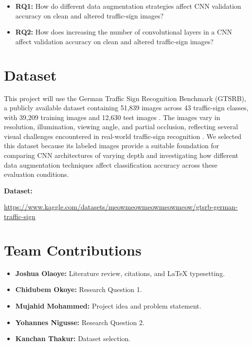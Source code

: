 \documentclass[11pt,letterpaper]{article}
\begin{document}
\begin{itemize}
  \item \textbf{RQ1:}	How do different data augmentation strategies affect CNN validation accuracy on clean and altered traffic-sign images?
  \item \textbf{RQ2:}	How does increasing the number of convolutional layers in a CNN affect validation accuracy on clean and altered traffic-sign images?
\end{itemize}

\section*{Dataset}
This project will use the German Traffic Sign Recognition Benchmark (GTSRB), a publicly available dataset containing 51,839 images across 43 traffic-sign classes, with 39,209 training images and 12,630 test images \cite{stallkamp2011gtsrb}. 
The images vary in resolution, illumination, viewing angle, and partial occlusion, reflecting several visual challenges encountered in real-world traffic-sign recognition \cite{stallkamp2011gtsrb}. 
We selected this dataset because its labeled images provide a suitable foundation for comparing CNN architectures of varying depth and investigating how different data augmentation techniques affect classification accuracy across these evaluation conditions.

\smallskip

\noindent\textbf{Dataset: }\par
\noindent\url{https://www.kaggle.com/datasets/meowmeowmeowmeowmeow/gtsrb-german-traffic-sign}




\section*{Team Contributions}

\begin{itemize}
  \item \textbf{Joshua Olaoye:} Literature review, citations, and LaTeX typesetting.
  \item \textbf{Chidubem Okoye:} Research Question 1.
  \item \textbf{Mujahid Mohammed:} Project idea and problem statement.
  \item \textbf{Yohannes Nigusse:} Research Question 2.
  \item \textbf{Kanchan Thakur:} Dataset selection.
\end{itemize}
\end{document}
